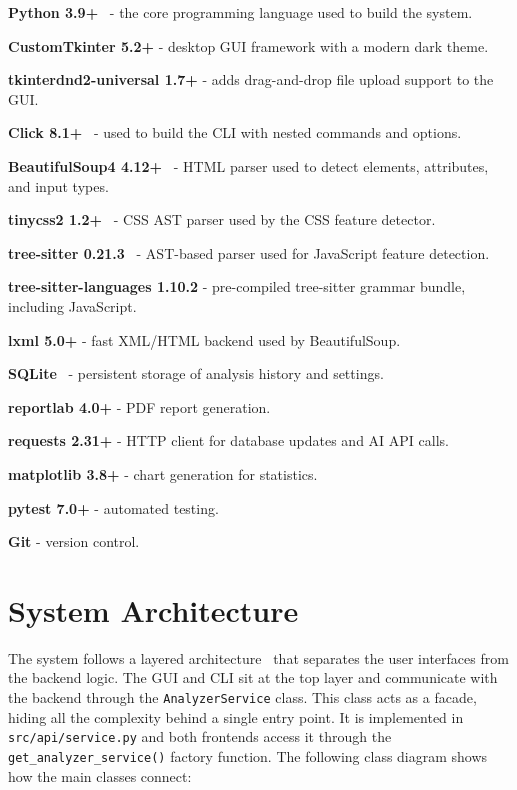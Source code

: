 \begin{compactitem}
    \item \textbf{Python 3.9+}~\cite{python39} - the core programming language used to build the system.
    \item \textbf{CustomTkinter 5.2+} - desktop GUI framework with a modern dark theme.
    \item \textbf{tkinterdnd2-universal 1.7+} - adds drag-and-drop file upload support to the GUI.
    \item \textbf{Click 8.1+}~\cite{clickdocs} - used to build the CLI with nested commands and options.
    \item \textbf{BeautifulSoup4 4.12+}~\cite{bs4docs} - HTML parser used to detect elements, attributes, and input types.
    \item \textbf{tinycss2 1.2+}~\cite{tinycss2} - CSS AST parser used by the CSS feature detector.
    \item \textbf{tree-sitter 0.21.3}~\cite{treesitter} - AST-based parser used for JavaScript feature detection.
    \item \textbf{tree-sitter-languages 1.10.2} - pre-compiled tree-sitter grammar bundle, including JavaScript.
    \item \textbf{lxml 5.0+} - fast XML/HTML backend used by BeautifulSoup.
    \item \textbf{SQLite}~\cite{sqlitedocs} - persistent storage of analysis history and settings.
    \item \textbf{reportlab 4.0+} - PDF report generation.
    \item \textbf{requests 2.31+} - HTTP client for database updates and AI API calls.
    \item \textbf{matplotlib 3.8+} - chart generation for statistics.
    \item \textbf{pytest 7.0+} - automated testing.
    \item \textbf{Git} - version control.
\end{compactitem}


\newpage
\section{System Architecture}
\label{sec:architecture}

The system follows a layered architecture~\cite{martin2017cleanarch} that separates the user interfaces from the backend logic. The GUI and CLI sit at the top layer and communicate with the backend through the \texttt{AnalyzerService} class. This class acts as a facade, hiding all the complexity behind a single entry point. It is implemented in \texttt{src/api/service.py} and both frontends access it through the \texttt{get\_analyzer\_service()} factory function. The following class diagram shows how the main classes connect:

